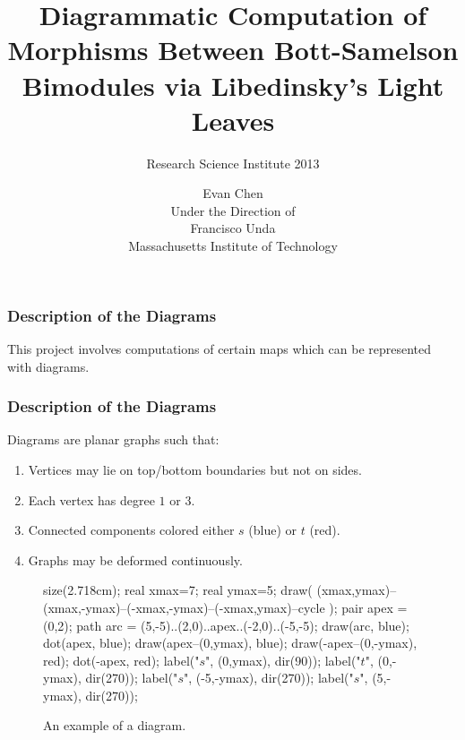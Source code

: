 \documentclass[pdf]{beamer}
\title[Maps in $\mathcal B_{\text{BS}}$]{Diagrammatic Computation of Morphisms Between Bott-Samelson Bimodules via Libedinsky's Light Leaves}
\subtitle[RSI 2013]{Research Science Institute 2013}
\author[Evan Chen]{Evan Chen \\ Under the Direction of \\ Francisco Unda \\ Massachusetts Institute of Technology}
\def\ii{\item}
\theoremstyle{definition}
\begin{document}
\begin{frame}
	\maketitle
\end{frame}


\begin{frame}[fragile]
	\frametitle{Description of the Diagrams}
	This project involves computations of certain maps which can be represented with diagrams.
\end{frame}

\begin{frame}[fragile]
	\frametitle{Description of the Diagrams}
	Diagrams are \alert{planar graphs} such that:
	\begin{enumerate}
		\ii Vertices may lie on top/bottom boundaries but not on sides.
		\ii Each vertex has degree $1$ or $3$.
		\ii Connected components colored either $s$ (blue) or $t$ (red).
		\ii Graphs may be deformed continuously.
	\end{enumerate}
	\begin{figure}[ht]
		\centering
		\begin{asy}
		size(2.718cm);
		real xmax=7;
		real ymax=5;
		draw( (xmax,ymax)--(xmax,-ymax)--(-xmax,-ymax)--(-xmax,ymax)--cycle );
		pair apex = (0,2);
		path arc = (5,-5)..(2,0)..apex..(-2,0)..(-5,-5);
		draw(arc, blue);
		dot(apex, blue);
		draw(apex--(0,ymax), blue);
		draw(-apex--(0,-ymax), red);
		dot(-apex, red);
		label("$s$", (0,ymax), dir(90));
		label("$t$", (0,-ymax), dir(270));
		label("$s$", (-5,-ymax), dir(270));
		label("$s$", (5,-ymax), dir(270));
		\end{asy}
		\caption{An example of a diagram.}
	\end{figure}
\end{frame}
\end{document}
